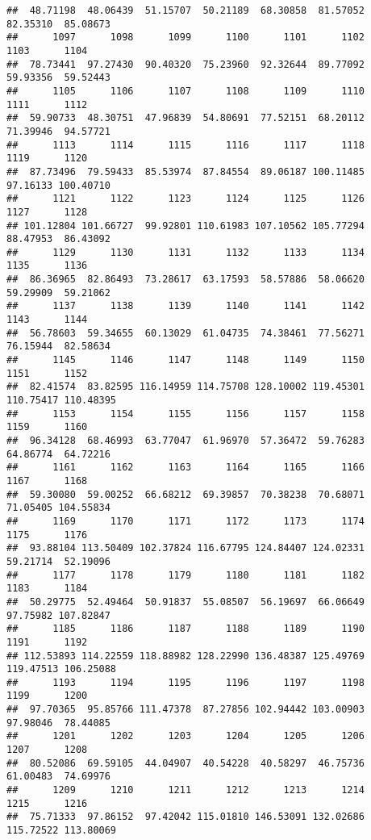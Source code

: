 \documentclass[
]{article}
\begin{document}
\begin{verbatim}
##  48.71198  48.06439  51.15707  50.21189  68.30858  81.57052  82.35310  85.08673 
##      1097      1098      1099      1100      1101      1102      1103      1104 
##  78.73441  97.27430  90.40320  75.23960  92.32644  89.77092  59.93356  59.52443 
##      1105      1106      1107      1108      1109      1110      1111      1112 
##  59.90733  48.30751  47.96839  54.80691  77.52151  68.20112  71.39946  94.57721 
##      1113      1114      1115      1116      1117      1118      1119      1120 
##  87.73496  79.59433  85.53974  87.84554  89.06187 100.11485  97.16133 100.40710 
##      1121      1122      1123      1124      1125      1126      1127      1128 
## 101.12804 101.66727  99.92801 110.61983 107.10562 105.77294  88.47953  86.43092 
##      1129      1130      1131      1132      1133      1134      1135      1136 
##  86.36965  82.86493  73.28617  63.17593  58.57886  58.06620  59.29909  59.21062 
##      1137      1138      1139      1140      1141      1142      1143      1144 
##  56.78603  59.34655  60.13029  61.04735  74.38461  77.56271  76.15944  82.58634 
##      1145      1146      1147      1148      1149      1150      1151      1152 
##  82.41574  83.82595 116.14959 114.75708 128.10002 119.45301 110.75417 110.48395 
##      1153      1154      1155      1156      1157      1158      1159      1160 
##  96.34128  68.46993  63.77047  61.96970  57.36472  59.76283  64.86774  64.72216 
##      1161      1162      1163      1164      1165      1166      1167      1168 
##  59.30080  59.00252  66.68212  69.39857  70.38238  70.68071  71.05405 104.55834 
##      1169      1170      1171      1172      1173      1174      1175      1176 
##  93.88104 113.50409 102.37824 116.67795 124.84407 124.02331  59.21714  52.19096 
##      1177      1178      1179      1180      1181      1182      1183      1184 
##  50.29775  52.49464  50.91837  55.08507  56.19697  66.06649  97.75982 107.82847 
##      1185      1186      1187      1188      1189      1190      1191      1192 
## 112.53893 114.22559 118.88982 128.22990 136.48387 125.49769 119.47513 106.25088 
##      1193      1194      1195      1196      1197      1198      1199      1200 
##  97.70365  95.85766 111.47378  87.27856 102.94442 103.00903  97.98046  78.44085 
##      1201      1202      1203      1204      1205      1206      1207      1208 
##  80.52086  69.59105  44.04907  40.54228  40.58297  46.75736  61.00483  74.69976 
##      1209      1210      1211      1212      1213      1214      1215      1216 
##  75.71333  97.86152  97.42042 115.01810 146.53091 132.02686 115.72522 113.80069 

\end{verbatim}
\end{document}
